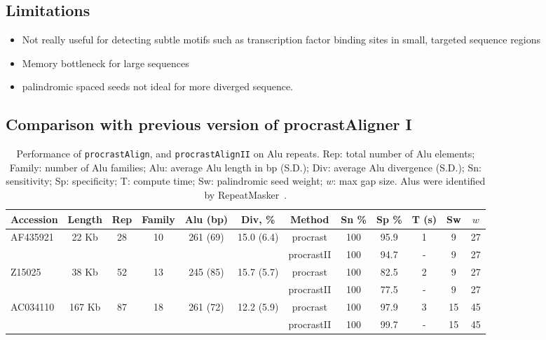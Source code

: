 \documentclass{llncs}
\begin{document}
\subsection{Limitations}
\begin{itemize}
\item Not really useful for detecting subtle motifs such as transcription factor
binding sites in small, targeted sequence regions
\item Memory bottleneck for large sequences
\item palindromic spaced seeds not ideal for more diverged sequence.
\end{itemize}

\subsection{Comparison with previous version of procrastAligner I}
\begin{table}[t]
  \centering
\begin{tabular}{lccccccccccc}
\hline Accession & Length & Rep & Family & Alu (bp) & Div, \% & Method & Sn \% & Sp \% & T (s) & Sw & $w$ \\
\hline
\hline AF435921 &  22 Kb &  28 & 10 & 261 (69) & 15.0 (6.4) & procrast & 100 & 95.9 & 1 & 9 & 27 \\
\cline{7-12}                                            &&&&&& procrastII & 100 & 94.7 & - & 9 & 27 \\
\hline Z15025 &    38 Kb &  52 & 13 & 245 (85) & 15.7 (5.7) & procrast & 100 & 82.5 & 2 & 9 & 27 \\
\cline{7-12}                                            &&&&&& procrastII & 100 & 77.5 & - & 9 & 27 \\
\hline AC034110 & 167 Kb &  87 & 18 & 261 (72) & 12.2 (5.9) & procrast & 100 & 97.9 & 3 & 15 & 45\\
\cline{7-12}                                            &&&&&& procrastII & 100 & 99.7 &- & 15 & 45 \\



\end{tabular}
\vspace{0.1cm}
  \caption{Performance of \texttt{procrastAlign}, and  \texttt{procrastAlignII} on Alu repeats.
  Rep: total number of Alu elements; Family: number of Alu
  families; Alu: average Alu length in bp (S.D.); Div: average Alu divergence (S.D.);
   Sn: sensitivity; Sp: specificity; T: compute time; Sw: palindromic seed weight; $w$: max gap size.  Alus were
  identified by RepeatMasker~\cite{ref-repbase}.}
  \label{table:alu}
\end{table}
\end{document}
